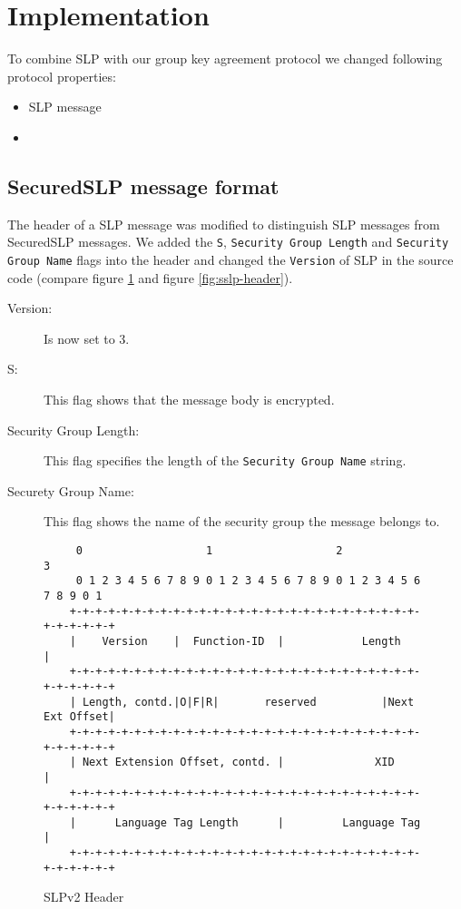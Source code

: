 \section{Implementation}
To combine SLP with our group key agreement protocol we changed following protocol properties:
\begin{itemize}
  \item SLP message
  \item 
\end{itemize}

\subsection{SecuredSLP message format}
The header of a SLP message was modified to distinguish SLP messages from SecuredSLP messages. We added the \texttt{S}, \texttt{Security Group Length} and \texttt{Security Group Name} flags into the header and changed the \texttt{Version} of SLP in the source code (compare figure \ref{fig:slp-header} and figure \ref{fig:sslp-header}).
\begin{description}
\item[Version:] Is now set to 3.
\item[S:] This flag shows that the message body is encrypted.
\item[Security Group Length:] This flag specifies the length of the \texttt{Security Group Name} string.  
\item[Securety Group Name:] This flag shows the name of the security group the message belongs to.
\end{description}

\begin{figure}
\begin{lstlisting}
	 0                   1                   2                   3
	 0 1 2 3 4 5 6 7 8 9 0 1 2 3 4 5 6 7 8 9 0 1 2 3 4 5 6 7 8 9 0 1
	+-+-+-+-+-+-+-+-+-+-+-+-+-+-+-+-+-+-+-+-+-+-+-+-+-+-+-+-+-+-+-+-+
	|    Version    |  Function-ID  |            Length             |
	+-+-+-+-+-+-+-+-+-+-+-+-+-+-+-+-+-+-+-+-+-+-+-+-+-+-+-+-+-+-+-+-+
	| Length, contd.|O|F|R|       reserved          |Next Ext Offset|
	+-+-+-+-+-+-+-+-+-+-+-+-+-+-+-+-+-+-+-+-+-+-+-+-+-+-+-+-+-+-+-+-+
	| Next Extension Offset, contd. |              XID              |
	+-+-+-+-+-+-+-+-+-+-+-+-+-+-+-+-+-+-+-+-+-+-+-+-+-+-+-+-+-+-+-+-+
	|      Language Tag Length      |         Language Tag          |
	+-+-+-+-+-+-+-+-+-+-+-+-+-+-+-+-+-+-+-+-+-+-+-+-+-+-+-+-+-+-+-+-+
\end{lstlisting}
\label{fig:slp-header}
\caption{SLPv2 Header}
\end{figure}

